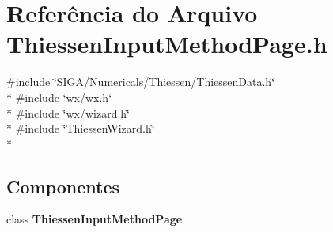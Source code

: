 \section{Referência do Arquivo Thiessen\+Input\+Method\+Page.\+h}
\label{_thiessen_input_method_page_8h}
{\ttfamily \#include \char`\"{}S\+I\+G\+A/\+Numericals/\+Thiessen/\+Thiessen\+Data.\+h\char`\"{}}\\*
{\ttfamily \#include \char`\"{}wx/wx.\+h\char`\"{}}\\*
{\ttfamily \#include \char`\"{}wx/wizard.\+h\char`\"{}}\\*
{\ttfamily \#include \char`\"{}Thiessen\+Wizard.\+h\char`\"{}}\\*
\subsection*{Componentes}
\begin{DoxyCompactItemize}
\item 
class {\bf Thiessen\+Input\+Method\+Page}
\end{DoxyCompactItemize}
